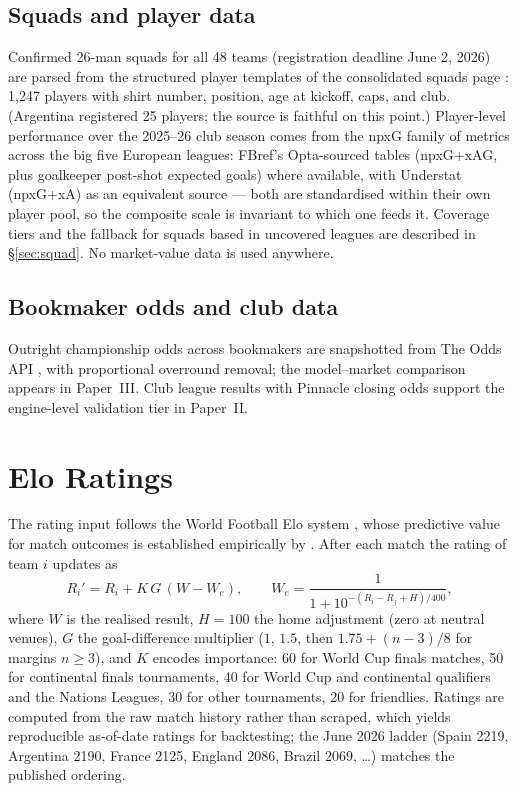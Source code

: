\documentclass[11pt]{article}
\begin{document}
\subsection{Squads and player data}
Confirmed 26-man squads for all 48 teams (registration deadline June 2, 2026)
are parsed from the structured player templates of the consolidated squads
page \cite{wikisquads}: 1{,}247 players with shirt number, position, age at
kickoff, caps, and club. (Argentina registered 25 players; the source is
faithful on this point.) Player-level performance over the 2025--26 club
season comes from the npxG family of metrics across the big five European
leagues: FBref's Opta-sourced tables (npxG+xAG, plus goalkeeper post-shot
expected goals) \cite{fbref} where available, with Understat (npxG+xA)
\cite{understat} as an equivalent source --- both are standardised within
their own player pool, so the composite scale is invariant to which one feeds
it. Coverage tiers and the fallback for squads based in uncovered leagues are
described in \S\ref{sec:squad}. No market-value data is used anywhere.

\subsection{Bookmaker odds and club data}
Outright championship odds across bookmakers are snapshotted from The Odds API
\cite{oddsapi}, with proportional overround removal; the model--market
comparison appears in Paper~III. Club league results with Pinnacle closing odds
\cite{footballdata} support the engine-level validation tier in Paper~II.

\section{Elo Ratings}\label{sec:elo}
The rating input follows the World Football Elo system \cite{eloratings}, whose
predictive value for match outcomes is established empirically by
\citet{hvattumarntzen2010}. After each match the rating of team $i$ updates as
\begin{equation}
  R_i' = R_i + K \, G \,(W - W_e), \qquad
  W_e = \frac{1}{1 + 10^{-(R_i - R_j + H)/400}},
\end{equation}
where $W$ is the realised result, $H{=}100$ the home adjustment (zero at
neutral venues), $G$ the goal-difference multiplier ($1$, $1.5$, then
$1.75 + (n-3)/8$ for margins $n \ge 3$), and $K$ encodes importance: 60 for
World Cup finals matches, 50 for continental finals tournaments, 40 for World
Cup and continental qualifiers and the Nations Leagues, 30 for other
tournaments, 20 for friendlies. Ratings are computed from the raw match
history rather than scraped, which yields reproducible as-of-date ratings for
backtesting; the June 2026 ladder (Spain 2219, Argentina 2190, France 2125,
England 2086, Brazil 2069, \ldots) matches the published ordering.
\end{document}
